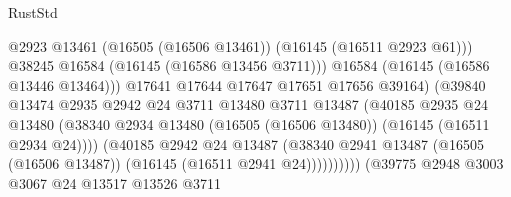 \begin{lexlean}{RustStd}
\begin{coremodule}
                                                @2923
                                                @13461
                                                (@16505 (@16506 @13461))
                                                (@16145 (@16511 @2923 @61)))
                                              @38245
                                              @16584
                                              (@16145 (@16586 @13456 @3711)))
                                            @16584
                                            (@16145 (@16586 @13446 @13464)))
                                          @17641
                                          @17644
                                          @17647
                                          @17651
                                          @17656
                                          @39164)
                                        (@39840
                                          @13474
                                          @2935
                                          @2942
                                          @24
                                          @3711
                                          @13480
                                          @3711
                                          @13487
                                          (@40185
                                            @2935
                                            @24
                                            @13480
                                            (@38340
                                              @2934
                                              @13480
                                              (@16505 (@16506 @13480))
                                              (@16145 (@16511 @2934 @24))))
                                          (@40185
                                            @2942
                                            @24
                                            @13487
                                            (@38340
                                              @2941
                                              @13487
                                              (@16505 (@16506 @13487))
                                              (@16145 (@16511 @2941 @24))))))))))
                              (@39775
                                @2948
                                @3003
                                @3067
                                @24
                                @13517
                                @13526
                                @3711

\end{coremodule}
\end{lexlean}
